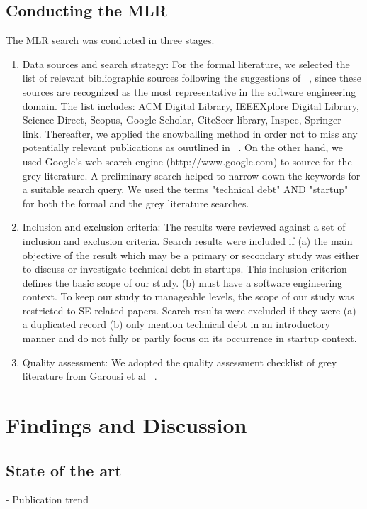 \documentclass[manuscript]{acmart}
\begin{document}
\subsection{Conducting the MLR}
The MLR search was conducted in three stages.
\begin{enumerate}
\item Data sources and search strategy: For the formal literature, we selected the list of relevant bibliographic sources following the suggestions of ~\cite{kitchenham2007guidelines}, since these sources are
recognized as the most representative in the software engineering domain. The list includes: ACM Digital Library,
IEEEXplore Digital Library, Science Direct, Scopus, Google Scholar, CiteSeer library, Inspec, Springer link. Thereafter, we applied the snowballing method in order not to miss any potentially relevant publications as ouutlined in ~\cite{Wohlin2014/2601248.2601268}.
On the other hand, we used Google's web search engine (http://www.google.com) to source for the grey literature.
A preliminary search helped to narrow down the keywords for a suitable search query. We used the terms "technical debt" AND "startup" for both the formal and the grey literature searches.
\item Inclusion and exclusion criteria: The results were reviewed against a set of inclusion and exclusion criteria. Search results were included if (a) the main objective of the result which may be a primary or secondary  study was either to discuss or investigate technical debt in startups. This inclusion criterion defines the basic scope of our study.
(b) must have a software engineering context. To keep our study to manageable levels, the scope of our study was restricted to SE related papers.
Search results were excluded if they were (a) a duplicated record (b) only mention technical debt in an introductory manner and do not fully or partly focus on its occurrence in startup context.
\item Quality assessment: We adopted the quality assessment checklist of grey literature from Garousi et al ~\cite{GAROUSI2019101}.


\end{enumerate}
\section{Findings and Discussion}

\subsection{State of the art}
- Publication trend
\end{document}
